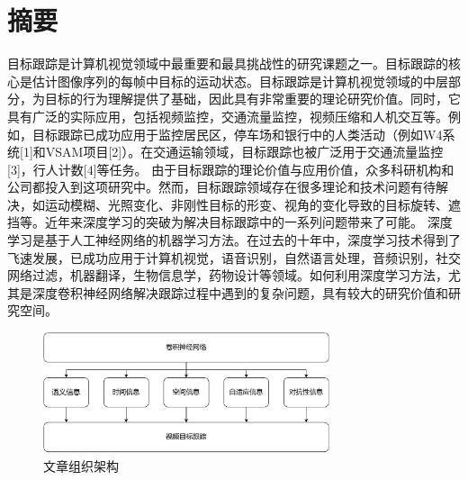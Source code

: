 \maketitle%
\MAKETITLE%
\makedeclaration%
\intobmk\chapter*{摘\quad 要}%
\setcounter{page}{1}%

目标跟踪是计算机视觉领域中最重要和最具挑战性的研究课题之一。目标跟踪的核心是估计图像序列的每帧中目标的运动状态。目标跟踪是计算机视觉领域的中层部分，为目标的行为理解提供了基础，因此具有非常重要的理论研究价值。同时，它具有广泛的实际应用，包括视频监控，交通流量监控，视频压缩和人机交互等。例如，目标跟踪已成功应用于监控居民区，停车场和银行中的人类活动（例如W4系统[1]和VSAM项目[2]）。在交通运输领域，目标跟踪也被广泛用于交通流量监控[3]，行人计数[4]等任务。
由于目标跟踪的理论价值与应用价值，众多科研机构和公司都投入到这项研究中。然而，目标跟踪领域存在很多理论和技术问题有待解决，如运动模糊、光照变化、非刚性目标的形变、视角的变化导致的目标旋转、遮挡等。近年来深度学习的突破为解决目标跟踪中的一系列问题带来了可能。
深度学习是基于人工神经网络的机器学习方法。在过去的十年中，深度学习技术得到了飞速发展，已成功应用于计算机视觉，语音识别，自然语言处理，音频识别，社交网络过滤，机器翻译，生物信息学，药物设计等领域。如何利用深度学习方法，尤其是深度卷积神经网络解决跟踪过程中遇到的复杂问题，具有较大的研究价值和研究空间。

\begin{figure}
\centering
\includegraphics[width=0.75\textwidth]{Img/paper_arch.pdf}
\caption{文章组织架构}
\end{figure}

